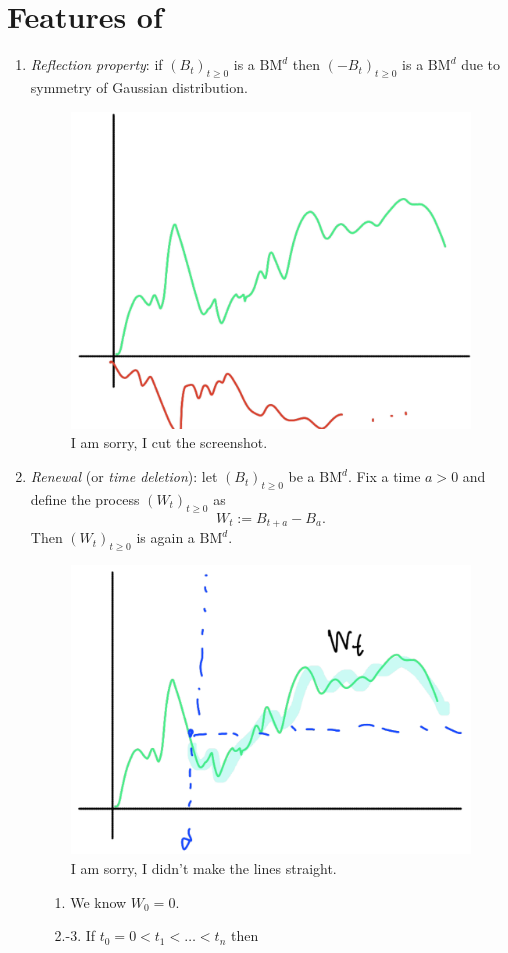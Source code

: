 \documentclass[12pt]{report}
\begin{document}
\section{Features of \bwm}
\begin{enumerate}[\circnum]
	\item \emph{Reflection property}: if ${(B_{t})}_{t\geq0}$ is a $\mathrm{BM}^{d}$ then ${(-B_{t})}_{t\geq0}$ is a $\mathrm{BM}^{d}$ due to symmetry of Gaussian distribution.
	\begin{figure}[H]
		\centering
		\includegraphics[width=0.4\linewidth]{img/screenshot011}
		\caption{I am sorry, I cut the screenshot.}
		\label{fig:screenshot011}
	\end{figure}
	\item \emph{Renewal} (or \emph{time deletion}): let ${(B_{t})}_{t\geq0}$ be a $\mathrm{BM}^{d}$. Fix a time $a>0$ and define the process ${(W_{t})}_{t\geq0}$ as
	\begin{equation*}
		W_{t}:=B_{t+a}-B_{a}.
	\end{equation*}
	Then ${(W_{t})}_{t\geq0}$ is again a $\mathrm{BM}^{d}$.
	\begin{figure}[H]
		\centering
		\includegraphics[width=0.4\linewidth]{img/screenshot012}
		\caption{I am sorry, I didn't make the lines straight.}
		\label{fig:screenshot012}
	\end{figure}
	\begin{fancyproof}
		\begin{enumerate}
			\item[1.] We know $W_{0}=0$.\hspace*{\fill}\faCheckCircle
			\item [2.-3.] If $t_{0}=0<t_{1}<\ldots<t_{n}$ then

\end{enumerate}
\end{fancyproof}
\end{enumerate}
\end{document}
